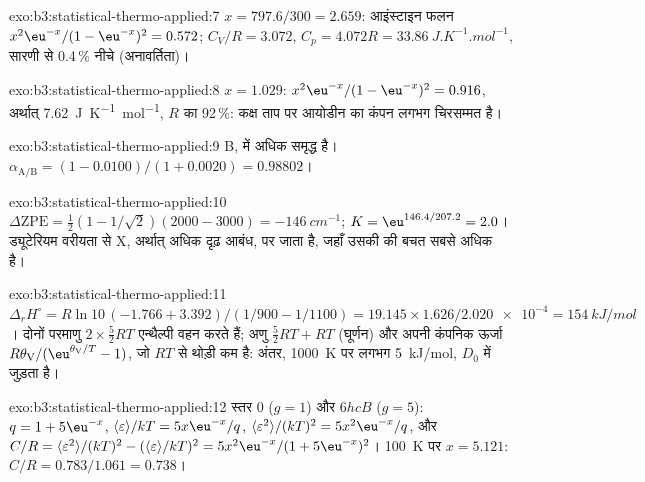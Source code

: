 \begin{solution}{exo:b3:statistical-thermo-applied:7}
$x = 797.6/300 = 2.659$: आइंस्टाइन फलन $x^2\eu^{-x}/(1 - \eu^{-x})^2 = 0.572$; $C_V/R = 3.072$,
$C_p = 4.072R = \qty{33.86}{J.K^{-1}.mol^{-1}}$, सारणी से 0.4\,\% नीचे (अनावर्तिता)।
\end{solution}

\begin{solution}{exo:b3:statistical-thermo-applied:8}
$x = 1.029$: $x^2\eu^{-x}/(1 - \eu^{-x})^2 = 0.916$, अर्थात् \qty{7.62}{J.K^{-1}.mol^{-1}}, $R$ का 92\,\%:
कक्ष ताप पर आयोडीन का कंपन लगभग चिरसम्मत है।
\end{solution}

\begin{solution}{exo:b3:statistical-thermo-applied:9}
B,  में अधिक समृद्ध है। $\alpha_{\mathrm{A/B}} = (1 - 0.0100)/(1 + 0.0020) = 0.98802$।
\end{solution}

\begin{solution}{exo:b3:statistical-thermo-applied:10}
$\Delta\mathrm{ZPE} = \frac12(1 - 1/\sqrt2)(2000 - 3000) = \qty{-146}{cm^{-1}}$; $K = \eu^{146.4/207.2} = 2.0$।
ड्यूटेरियम वरीयता से X, अर्थात् अधिक दृढ़ आबंध, पर जाता है, जहाँ उसकी  की बचत सबसे अधिक है।
\end{solution}

\begin{solution}{exo:b3:statistical-thermo-applied:11}
$\Delta_rH^\circ = R\ln10\,(-1.766 + 3.392)/(1/900 - 1/1100) = 19.145 \times 1.626/\num{2.020e-4} =
\qty{154}{kJ/mol}$। दोनों परमाणु $2 \times \frac52RT$ एन्थैल्पी वहन करते हैं; अणु $\frac52RT + RT$
(घूर्णन) और अपनी कंपनिक ऊर्जा $R\theta_{\mathrm V}/(\eu^{\theta_{\mathrm V}/T} - 1)$, जो $RT$ से थोड़ी कम है:
अंतर, \qty{1000}{K} पर लगभग \qty{5}{kJ/mol}, $D_0$ में जुड़ता है।
\end{solution}

\begin{solution}{exo:b3:statistical-thermo-applied:12}
स्तर 0 ($g = 1$) और $6hcB$ ($g = 5$): $q = 1 + 5\eu^{-x}$, $\langle\varepsilon\rangle/kT = 5x\eu^{-x}/q$, $\langle\varepsilon^2\rangle/(kT)^2 =
5x^2\eu^{-x}/q$, और $C/R = \langle\varepsilon^2\rangle/(kT)^2 - (\langle\varepsilon\rangle/kT)^2 = 5x^2\eu^{-x}/(1 + 5\eu^{-x})^2$।
\qty{100}{K} पर $x = 5.121$: $C/R = 0.783/1.061 = 0.738$।
\end{solution}


